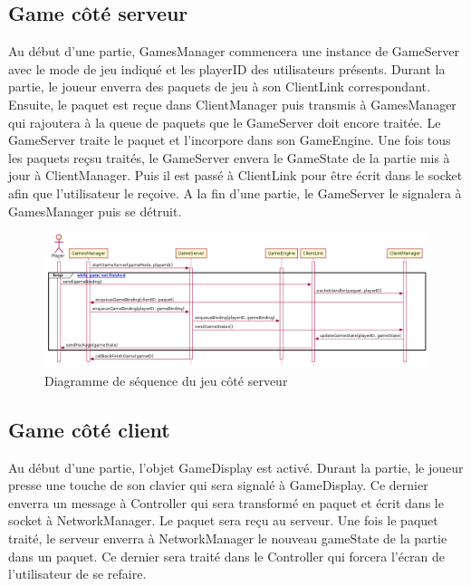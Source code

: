 \documentclass{article}
\begin{document}
\subsection{Game côté serveur}

Au début d'une partie, GamesManager commencera une instance de GameServer avec le mode de jeu indiqué et les playerID des utilisateurs présents. Durant la partie, le joueur enverra des paquets de jeu à son ClientLink correspondant. Ensuite, le paquet est reçue dans ClientManager puis transmis à GamesManager qui rajoutera à la queue de paquets que le GameServer doit encore traitée. Le GameServer traite le paquet et l'incorpore dans son GameEngine. Une fois tous les paquets reçsu traités, le GameServer envera le GameState de la partie mis à jour à ClientManager. Puis il est passé à ClientLink pour être écrit dans le socket afin que l'utilisateur le reçoive. A la fin d'une partie, le GameServer le signalera à GamesManager puis se détruit.

\begin{figure}[H]
    \centering
    \includegraphics[width=1\textwidth]{../../res/uml/sequence/GameServerSequence.png}
    \caption{Diagramme de séquence du jeu côté serveur}
    \label{fig:GameServerSeqDiagram}
\end{figure}

\subsection{Game côté client}

Au début d'une partie, l'objet GameDisplay est activé. Durant la partie, le joueur presse une touche de son clavier qui sera signalé à GameDisplay. Ce dernier enverra un message à Controller qui sera transformé en paquet et écrit dans le socket à NetworkManager. Le paquet sera reçu au serveur. Une fois le paquet traité, le serveur enverra à NetworkManager le nouveau gameState de la partie dans un paquet. Ce dernier sera traité dans le Controller qui forcera l'écran de l'utilisateur de se refaire.
\end{document}
